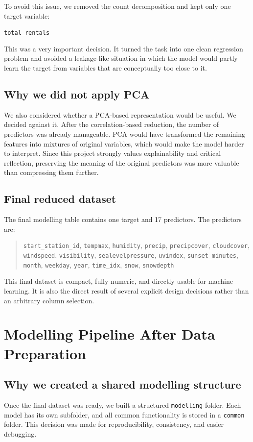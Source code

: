 \documentclass[conference]{IEEEtran}
\begin{document}
To avoid this issue, we removed the count decomposition and kept only one target variable:
\begin{center}
\texttt{total\_rentals}
\end{center}

This was a very important decision. It turned the task into one clean regression problem and 
avoided a leakage-like situation in which the model would partly learn the target from variables 
that are conceptually too close to it.

\subsection{Why we did not apply PCA}
We also considered whether a PCA-based representation would be useful. We decided against it. After 
the correlation-based reduction, the number of predictors was already manageable. PCA would have 
transformed the remaining features into mixtures of original variables, which would make the model 
harder to interpret. Since this project strongly values explainability and critical reflection, 
preserving the meaning of the original predictors was more valuable than compressing them further.

\subsection{Final reduced dataset}
The final modelling table contains one target and 17 predictors. The predictors are:
\begin{quote}
\small
\texttt{start\_station\_id}, \texttt{tempmax}, \texttt{humidity}, \texttt{precip}, \texttt{precipcover}, \texttt{cloudcover}, \texttt{windspeed}, \texttt{visibility}, \texttt{sealevelpressure}, \texttt{uvindex}, \texttt{sunset\_minutes}, \texttt{month}, \texttt{weekday}, \texttt{year}, \texttt{time\_idx}, \texttt{snow}, \texttt{snowdepth}
\end{quote}

This final dataset is compact, fully numeric, and directly usable for machine learning. It is also 
the direct result of several explicit design decisions rather than an arbitrary column selection.

\section{Modelling Pipeline After Data Preparation}
\subsection{Why we created a shared modelling structure}
Once the final dataset was ready, we built a structured \texttt{modelling} folder. Each model has its 
own subfolder, and all common functionality is stored in a \texttt{common} folder. This decision was 
made for reproducibility, consistency, and easier debugging.
\end{document}
